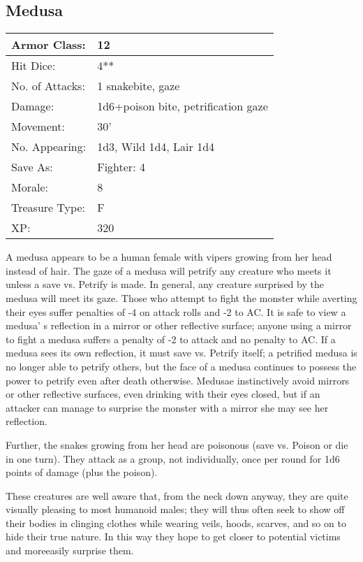 \documentclass[a4paper,twoside,openany,10pt]{book}
\begin{document}
\begin{multicols}{2}
\subsection*{Medusa}\label{medusa}

\begin{tabularx}{0.50\textwidth}{@{}lX@{}}
Armor Class: & 12 \\\hline
Hit Dice: & 4** \\\hline
No. of Attacks: & 1 snakebite, gaze \\\hline
Damage: & 1d6+poison bite, petrification gaze \\\hline
Movement: & 30' \\\hline
No. Appearing: & 1d3, Wild 1d4, Lair 1d4 \\\hline
Save As: & Fighter: 4 \\\hline
Morale: & 8 \\\hline
Treasure Type: & F \\\hline
XP: & 320 \\\hline
\end{tabularx}\medskip

A medusa appears to be a human female with vipers growing from her head instead of hair. The gaze of a medusa will petrify any creature who meets it unless a save vs. Petrify is made. In general, any creature surprised by the medusa will meet its gaze. Those who attempt to fight the monster while averting their eyes suffer penalties of -4 on attack rolls and -2 to AC. It is safe to view a medusa' s reflection in a mirror or other reflective surface; anyone using a mirror to fight a medusa suffers a penalty of -2 to attack and no penalty to AC. If a medusa sees its own reflection, it must save vs. Petrify itself; a petrified medusa is no longer able to petrify others, but the face of a medusa continues to possess the power to petrify even after death otherwise. Medusae instinctively avoid mirrors or other reflective surfaces, even drinking with their eyes closed, but if an attacker can manage to surprise the monster with a mirror she may see her reflection.

Further, the snakes growing from her head are poisonous (save vs. Poison or die in one turn). They attack as a group, not individually, once per round for 1d6 points of damage (plus the poison).

These creatures are well aware that, from the neck down anyway, they are quite visually pleasing to most humanoid males; they will thus often seek to show off their bodies in clinging clothes while wearing veils, hoods, scarves, and so on to hide their true nature. In this way they hope to get closer to potential victims and moreeasily surprise them.


\end{multicols}
\end{document}
